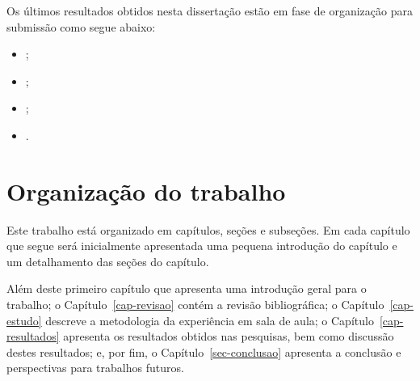 Os últimos resultados obtidos nesta dissertação estão
em fase de organização para submissão como segue abaixo:

\begin{itemize}
\item{;}
\item{;}
\item{;}
\item{.}
\end{itemize}

\section{Organização do trabalho}
Este trabalho está organizado em capítulos, seções e subseções.
Em cada capítulo que segue será inicialmente
apresentada uma pequena introdução do capítulo e um detalhamento
das seções do capítulo.

Além deste primeiro capítulo que apresenta uma introdução geral
para o trabalho;
o Capítulo~\ref{cap-revisao} contém a revisão bibliográfica;
o Capítulo~\ref{cap-estudo} descreve a metodologia da experiência em sala de aula;
o Capítulo~\ref{cap-resultados} apresenta os resultados obtidos nas pesquisas, bem
como discussão destes resultados;
e, por fim, o Capítulo~\ref{sec-conclusao} apresenta a conclusão e perspectivas
para trabalhos futuros.

